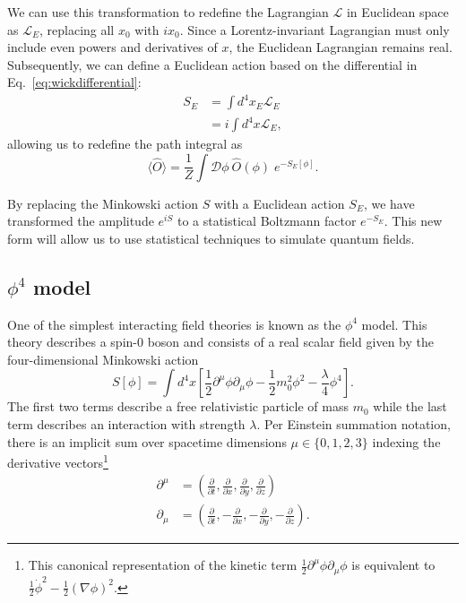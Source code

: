 We can use this transformation to redefine the Lagrangian $\mathcal{L}$ in Euclidean space as $\mathcal{L}_E$, replacing all $x_0$ with $ix_0$. Since a Lorentz-invariant Lagrangian must only include even powers and derivatives of $x$, the Euclidean Lagrangian remains real. Subsequently, we can define a Euclidean action based on the differential in Eq.~\ref{eq:wickdifferential}:
\begin{align}
    S_E &= \int d^4x_E \mathcal{L}_E \nonumber \\
    &= i \int d^4x \mathcal{L}_E,
\end{align}
allowing us to redefine the path integral as 
\begin{equation}
    \label{eq:pathintegraleuclidean}
    \langle \hat O \rangle = \frac{1}{Z} \int \mathcal{D}\phi \: \hat O (\phi)\; e^{-S_E[\phi]}.
\end{equation}

By replacing the Minkowski action $S$ with a Euclidean action $S_E$, we have transformed the amplitude $e^{iS}$ to a statistical Boltzmann factor $e^{-S_E}$. This new form will allow us to use statistical techniques to simulate quantum fields.

\subsection{$\phi^4$ model}
\label{sec:phi4}

One of the simplest interacting field theories is known as the $\phi^4$ model. This theory describes a spin-0 boson and consists of a real scalar field given by the four-dimensional Minkowski action
\begin{equation}
    \label{eq:phi4 action}
    S[\phi] = \int d^4 x \left[ \frac{1}{2}\partial^\mu \phi \partial_\mu\phi - \frac{1}{2} m_0^2 \phi^2 - \frac{\lambda}{4}\phi^4\right].
\end{equation}
The first two terms describe a free relativistic particle of mass $m_0$ while the last term describes an interaction with strength $\lambda$. Per Einstein summation notation, there is an implicit sum over spacetime dimensions $\mu\in\{0,1,2,3\}$ indexing the derivative vectors\footnote{This canonical representation of the kinetic term $\frac{1}{2}\partial^\mu\phi\partial_\mu\phi$ is equivalent to $\frac{1}{2}\dot\phi^2-\frac{1}{2}\left(\nabla \phi\right)^2$.}
\begin{align}
    \partial^\mu &= \left( \frac{\partial}{\partial t}, \frac{\partial}{\partial x},\frac{\partial}{\partial y}, \frac{\partial}{\partial z} \right) \\
    \partial_\mu &= \left( \frac{\partial}{\partial t}, -\frac{\partial}{\partial x}, -\frac{\partial}{\partial y}, -\frac{\partial}{\partial z} \right).
\end{align}

